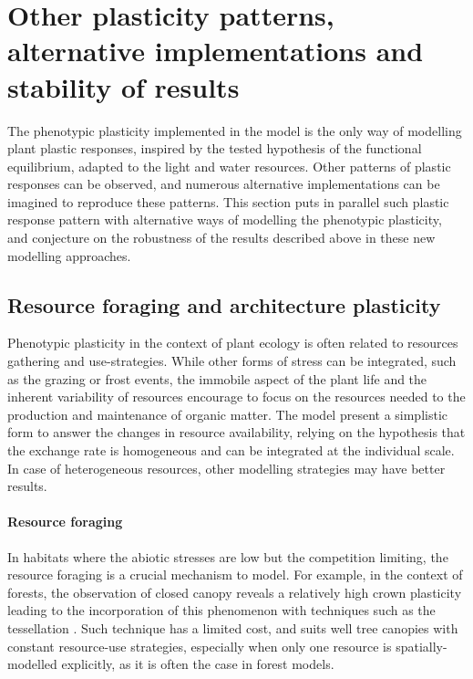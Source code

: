 \section{Other plasticity patterns, alternative implementations and stability of results}\label{section:stability}


The phenotypic plasticity implemented in the model \model is the only way of modelling plant plastic responses, inspired by the tested hypothesis of the functional equilibrium, adapted to the light and water resources. Other patterns of plastic responses can be observed, and numerous alternative implementations can be imagined to reproduce these patterns. This section puts in parallel such plastic response pattern with alternative ways of modelling the phenotypic plasticity, and conjecture on the robustness of the results described above in these new modelling approaches.


\subsection{Resource foraging and architecture plasticity}

Phenotypic plasticity in the context of plant ecology is often related to resources gathering and use-strategies. While other forms of stress can be integrated, such as the grazing or frost events, the immobile aspect of the plant life and the inherent variability of resources encourage to focus on the resources needed to the production and maintenance of organic matter. The model \model present a simplistic form to answer the changes in resource availability, relying on the hypothesis that the exchange rate is homogeneous and can be integrated at the individual scale. In case of heterogeneous resources, other modelling strategies may have better results.

\paragraph{Resource foraging}

In habitats where the abiotic stresses are low but the competition limiting, the resource foraging is a crucial mechanism to model. For example, in the context of forests, the observation of closed canopy reveals a relatively high crown plasticity leading to the incorporation of this phenomenon with techniques such as the tessellation \parencite{berger_competition_2008}. Such technique has a limited cost, and suits well tree canopies with constant resource-use strategies, especially when only one resource is spatially-modelled explicitly, as it is often the case in forest models. 

